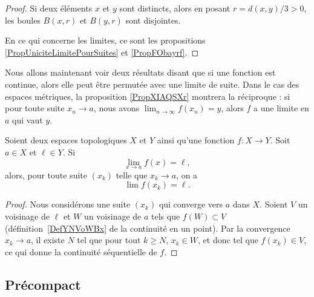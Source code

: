 \begin{proof}
	Si deux éléments \( x \) et \( y \) sont distincts, alors en posant \( r = d(x , y) / 3 > 0 \), les boules \( B(x,r) \) et \( B(y,r)\) sont disjointes.

	En ce qui concerne les limites, ce sont les propositions \ref{PropUniciteLimitePourSuites} et \ref{PropFObayrf}.
\end{proof}

\begin{normaltext}
	Nous allons maintenant voir deux résultats disant que si une fonction est continue, alors elle peut être permutée avec une limite de suite. Dans le cas des espaces métriques, la proposition \ref{PropXIAQSXr} montrera la réciproque : si pour toute suite \(x_n\to a\), nous avons \( \lim_{n\to \infty} f(x_n)=y\), alors \( f\) a une limite en \( a\) qui vaut \( y\).
\end{normaltext}

\begin{proposition} \label{fContEstSeqCont}
	Soient deux espaces topologiques \( X\) et \( Y\) ainsi qu'une fonction \( f\colon X\to Y\). Soit \( a\in X\) et \( \ell\in Y\). Si
	\begin{equation}
		\lim_{x\to a} f(x)=\ell,
	\end{equation}
	alors, pour toute suite \( (x_k) \) telle que \( x_k \to a \), on a
	\begin{equation}
		\lim f(x_k)=\ell.
	\end{equation}
\end{proposition}

\begin{proof}
	Nous considérons une suite \( (x_k)\) qui converge vers \( a\) dans \( X\). Soient \( V\) un voisinage de \( \ell \) et \( W\) un voisinage de \( a\) tels que \( f(W)\subset V\) (définition~\ref{DefYNVoWBx} de la continuité en un point). Par la convergence \( x_k\to a\),  il existe \( N\) tel que pour tout \( k\geq N\), \( x_k\in W\), et donc tel que \( f(x_k)\in V\), ce qui donne la continuité séquentielle de \( f\).
\end{proof}


\subsection{Précompact}


